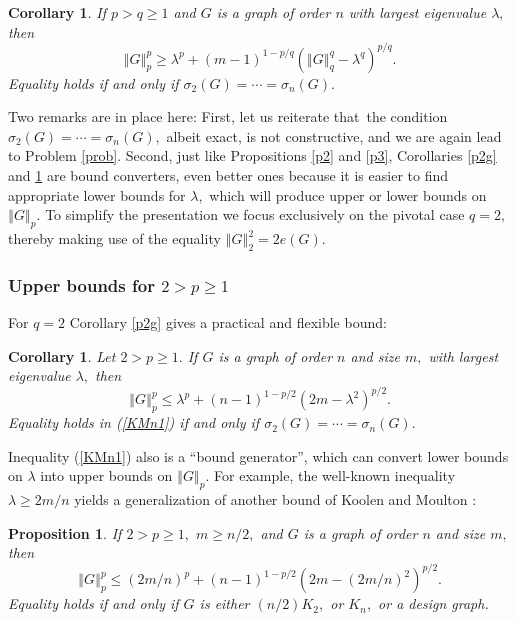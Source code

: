\documentclass[12pt]{article}%
\newtheorem{corollary}[theorem]{Corollary}
\newtheorem{proposition}[theorem]{Proposition}
\begin{document}
\begin{corollary}
\label{p3g}If $p>q\geq1$ and $G$ is a graph of order $n$ with largest
eigenvalue $\lambda,$ then
\[
\left\Vert G\right\Vert _{p}^{p}\geq\lambda^{p}+\left(  m-1\right)
^{1-p/q}\left(  \left\Vert G\right\Vert _{q}^{q}-\lambda^{q}\right)  ^{p/q}.
\]
Equality holds if and only if $\sigma_{2}\left(  G\right)  =\cdots=\sigma
_{n}\left(  G\right)  .$
\end{corollary}

Two remarks are in place here: First, let us reiterate that\ the condition
$\sigma_{2}\left(  G\right)  =\cdots=\sigma_{n}\left(  G\right)  ,$ albeit
exact, is not constructive, and we are again lead to Problem \ref{prob}.
Second, just like Propositions \ref{p2} and \ref{p3}, Corollaries \ref{p2g}
and \ref{p3g} are bound converters, even better ones because it is easier to
find appropriate lower bounds for $\lambda,$ which will produce upper or lower
bounds on $\left\Vert G\right\Vert _{p}.$ To simplify the presentation we
focus exclusively on the pivotal case $q=2,$ thereby making use of the
equality $\left\Vert G\right\Vert _{2}^{2}=2e\left(  G\right)  $.

\subsubsection{Upper bounds for $2>p\geq1$}

For $q=2$ Corollary \ref{p2g} gives a practical and flexible bound:

\begin{corollary}
\label{pro4}Let $2>p\geq1.$ If $G$ is a graph of order $n$ and size $m,$ with
largest eigenvalue $\lambda,$ then
\begin{equation}
\left\Vert G\right\Vert _{p}^{p}\leq\lambda^{p}+\left(  n-1\right)
^{1-p/2}\left(  2m-\lambda^{2}\right)  ^{p/2}. \label{KMn1}%
\end{equation}
Equality holds in (\ref{KMn1}) if and only if $\sigma_{2}\left(  G\right)
=\cdots=\sigma_{n}\left(  G\right)  .$
\end{corollary}

Inequality (\ref{KMn1}) also is a \textquotedblleft bound
generator\textquotedblright, which can convert lower bounds on $\lambda$ into
upper bounds on $\left\Vert G\right\Vert _{p}.$ For example, the well-known
inequality $\lambda\geq2m/n$ yields a generalization of another bound of
Koolen and Moulton \cite{KoMo01}:

\begin{proposition}
\label{th5}If $2>p\geq1,$ $m\geq n/2,$ and $G$ is a graph of order $n$ and
size $m,$ then
\begin{equation}
\left\Vert G\right\Vert _{p}^{p}\leq\left(  2m/n\right)  ^{p}+\left(
n-1\right)  ^{1-p/2}\left(  2m-\left(  2m/n\right)  ^{2}\right)  ^{p/2}.
\label{bo2}%
\end{equation}
Equality holds if and only if $G$ is either $\left(  n/2\right)  K_{2},$ or
$K_{n},$ or a design graph.
\end{proposition}
\end{document}
